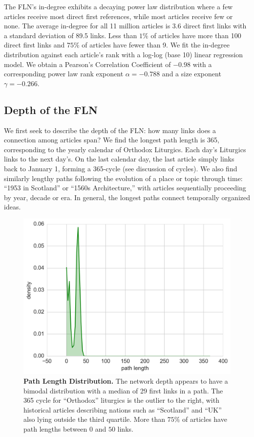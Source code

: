 \documentclass[pre,twocolumn,twoside,superscriptaddress,floatfix, aps, 10pt]{revtex4-1}
\begin{document}
The FLN's in-degree exhibits a decaying power law distribution where a few articles 
receive most direct first references, while most articles receive few or none.
The average in-degree for all 11 million articles is 3.6 direct first links with a standard deviation of 89.5 links.
Less than $1\%$ of articles have more than 100 direct first links and $75\%$ of articles
have fewer than 9. 
We fit the in-degree distribution against each article's rank with a log-log (base 10) linear regression model.
We obtain a Pearson's Correlation Coefficient of $-0.98$
with a corresponding  power law rank exponent $\alpha = -0.788$ and a size exponent $\gamma = -0.266$. 


\subsection{Depth of the FLN}

We first seek to describe the depth of the FLN: how many links does a 
connection among articles span? 
We find the longest path length is 365,
corresponding to the yearly calendar of Orthodox Liturgics.
Each day's Liturgics links to the next day's. On the last calendar day, the last article simply links back to January 1, forming a 365-cycle 
(see discussion of cycles).
We also find similarly lengthy paths following the evolution of a place or topic through time: 
``1953 in Scotland'' or ``1560s Architecture,'' with articles sequentially proceeding by year, decade or era.
In general, the longest paths connect temporally organized ideas.

\begin{figure}[tp!]
  \includegraphics[width=\columnwidth]{graphics/path_lengths_dist.png}
  \caption{
    \textbf{Path Length Distribution.}
The network depth appears to have a bimodal distribution with a median of 29 first links in a path.
The 365 cycle for ``Orthodox'' liturgics is the outlier to the right, with historical articles 
describing nations such as ``Scotland'' and ``UK'' also lying outside the third quartile.
More than $75\%$ of articles have path lengths between 
$0$ and $50$ links.}
  \label{fig:Path Length Distribution}
\end{figure}
\end{document}
